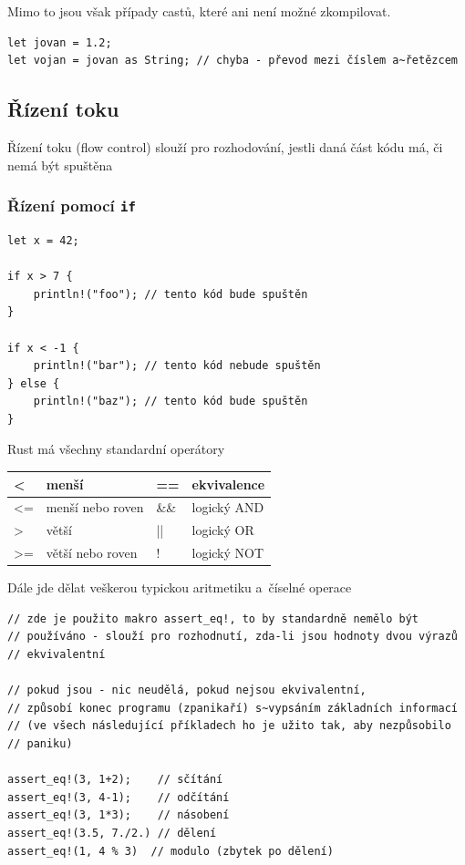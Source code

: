 \documentclass[a4paper, 12pt]{article} %
\newcommand{\rust}[1]{\texttt{#1}}
\begin{document}
			Mimo to jsou však případy castů, které ani není možné zkompilovat.
			\begin{verbatim}
let jovan = 1.2;
let vojan = jovan as String; // chyba - převod mezi číslem a~řetězcem
			\end{verbatim}

	\subsection{Řízení toku}
		Řízení toku (flow control) slouží pro rozhodování, jestli daná část kódu má, či nemá být spuštěna
	
	\subsubsection*{Řízení pomocí \rust{if}}
		\begin{verbatim}
let x = 42;

if x > 7 {
	println!("foo"); // tento kód bude spuštěn
}

if x < -1 {
	println!("bar"); // tento kód nebude spuštěn
} else {
	println!("baz"); // tento kód bude spuštěn
}
		\end{verbatim}
		
		Rust má všechny standardní operátory
			\begin{table}[h!]
				\centering
				\begin{tabular}{ll|ll}
					\hline
					\textless{} & menší & == & ekvivalence \\ \hline
					\textless{}= & menší nebo roven & \&\& & logický AND \\ \hline
					\textgreater{} & větší & || & logický OR \\ \hline
					\textgreater{}= & větší nebo roven & ! & logický NOT \\ \hline
				\end{tabular}
			\end{table}
		
		Dále jde dělat veškerou typickou aritmetiku a~číselné operace
		\begin{verbatim}
// zde je použito makro assert_eq!, to by standardně nemělo být
// používáno - slouží pro rozhodnutí, zda-li jsou hodnoty dvou výrazů
// ekvivalentní

// pokud jsou - nic neudělá, pokud nejsou ekvivalentní,
// způsobí konec programu (zpanikaří) s~vypsáním základních informací
// (ve všech následující příkladech ho je užito tak, aby nezpůsobilo 
// paniku)

assert_eq!(3, 1+2);    // sčítání
assert_eq!(3, 4-1);    // odčítání
assert_eq!(3, 1*3);    // násobení
assert_eq!(3.5, 7./2.) // dělení
assert_eq!(1, 4 % 3)  // modulo (zbytek po dělení)
		\end{verbatim}
\end{document}
